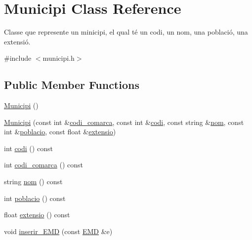\hypertarget{classMunicipi}{}\section{Municipi Class Reference}
\label{classMunicipi}


Classe que represente un minicipi, el qual té un codi, un nom, una població, una extensió.  




{\ttfamily \#include $<$municipi.\+h$>$}

\subsection*{Public Member Functions}
\begin{DoxyCompactItemize}
\item 
\hyperlink{classMunicipi_a4670585ae0cca72832d40e58b85a9ab7}{Municipi} ()
\item 
\hyperlink{classMunicipi_a3367dd3a452ef5484ad19cdb305eea6c}{Municipi} (const int \&\hyperlink{classMunicipi_ae95581bf220eb0e8bf0b70d423e2a57b}{codi\+\_\+comarca}, const int \&\hyperlink{classMunicipi_aa4a717b35e739dd728eb83eff99ebe70}{codi}, const string \&\hyperlink{classMunicipi_acab7010580062b67a1fd7b68064eed9a}{nom}, const int \&\hyperlink{classMunicipi_abafd1e3a64d82662c5aa24383c5d528e}{poblacio}, const float \&\hyperlink{classMunicipi_a66542f3f6e1a538f9fd6300bbe9bd147}{extensio})
\item 
int \hyperlink{classMunicipi_aa4a717b35e739dd728eb83eff99ebe70}{codi} () const
\item 
int \hyperlink{classMunicipi_ae95581bf220eb0e8bf0b70d423e2a57b}{codi\+\_\+comarca} () const
\item 
string \hyperlink{classMunicipi_acab7010580062b67a1fd7b68064eed9a}{nom} () const
\item 
int \hyperlink{classMunicipi_abafd1e3a64d82662c5aa24383c5d528e}{poblacio} () const
\item 
float \hyperlink{classMunicipi_a66542f3f6e1a538f9fd6300bbe9bd147}{extensio} () const
\item 
void \hyperlink{classMunicipi_afe0d63992f4407b8d7570aa87cc73881}{inserir\+\_\+\+E\+MD} (const \hyperlink{classEMD}{E\+MD} \&e)
\end{DoxyCompactItemize}
